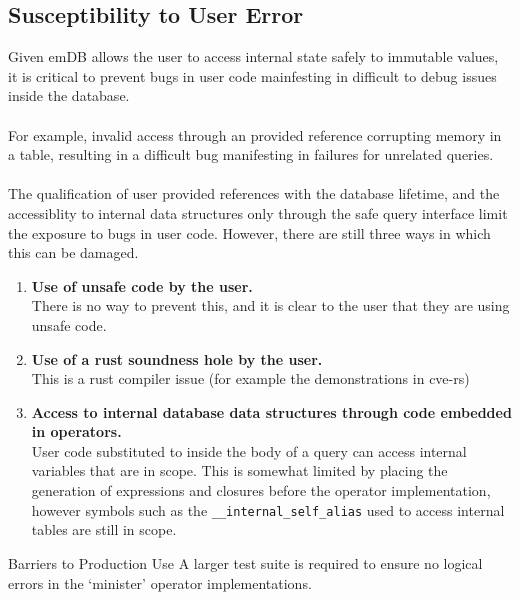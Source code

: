 \subsection{Susceptibility to User Error}
Given emDB allows the user to access internal state safely to immutable values, it is critical to
prevent bugs in user code mainfesting in difficult to debug issues inside the database.
\\
\\ For example, invalid access through an \emdb provided reference corrupting memory in a table,
resulting in a difficult bug manifesting in failures for unrelated queries.
\\
\\ The qualification of user provided references with the database lifetime, and the accessiblity to
internal data structures only through the safe query interface limit the exposure to bugs in user code.
However, there are still three ways in which this can be damaged.
\begin{enumerate}
    \setlength\itemsep{0em}
    \item {
          \textbf{Use of unsafe code by the user.} \\
          There is no way to prevent this, and it is clear to the user that they are using unsafe code.
          }
    \item {
          \textbf{Use of a rust soundness hole by the user.} \\
          This is a rust compiler issue (for example the demonstrations in cve-rs\cite{CVERS})
          }
    \item {
          \textbf{Access to internal database data structures through code embedded in operators.} \\
          User code substituted to inside the body of a query
          can access internal variables that are in scope. This is somewhat limited by placing the generation of expressions and closures
          before the operator implementation, however symbols such as the \texttt{__internal_self_alias} used to access internal
          tables are still in scope.
          }
\end{enumerate}

\begin{futurebox}{Barriers to Production Use}
    A larger test suite is required to ensure no logical errors in the `minister' operator implementations.
\end{futurebox}

